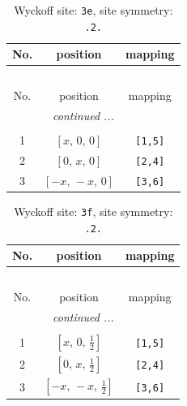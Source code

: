 \documentclass[fleqn,8pt]{jsarticle}
\begin{document}
\begin{longtable}{ccc}
\caption{Wyckoff site: {\tt 3e}, site symmetry: {\tt .2.}}
 \\
 \hline \hline
No. & position & mapping \\ \hline \endfirsthead

\multicolumn{2}{l}{\tablename\ \thetable{}} \\
 \hline \hline
No. & position & mapping \\ \hline \endhead

 \hline \hline
\multicolumn{2}{r}{\footnotesize\it continued ...} \\ \endfoot

 \hline \hline
\multicolumn{2}{r}{} \\ \endlastfoot

1 & $\left[ x,\, 0,\, 0 \right]$ & {\tt [1,5]} \\ \hline
2 & $\left[ 0,\, x,\, 0 \right]$ & {\tt [2,4]} \\ \hline
3 & $\left[ - x,\, - x,\, 0 \right]$ & {\tt [3,6]} \\
\end{longtable}
\renewcommand{\arraystretch}{1.2}
\begin{longtable}{ccc}
\caption{Wyckoff site: {\tt 3f}, site symmetry: {\tt .2.}}
 \\
 \hline \hline
No. & position & mapping \\ \hline \endfirsthead

\multicolumn{2}{l}{\tablename\ \thetable{}} \\
 \hline \hline
No. & position & mapping \\ \hline \endhead

 \hline \hline
\multicolumn{2}{r}{\footnotesize\it continued ...} \\ \endfoot

 \hline \hline
\multicolumn{2}{r}{} \\ \endlastfoot

1 & $\left[ x,\, 0,\, \frac{1}{2} \right]$ & {\tt [1,5]} \\ \hline
2 & $\left[ 0,\, x,\, \frac{1}{2} \right]$ & {\tt [2,4]} \\ \hline
3 & $\left[ - x,\, - x,\, \frac{1}{2} \right]$ & {\tt [3,6]} \\
\end{longtable}
\renewcommand{\arraystretch}{1.2}
\end{document}
